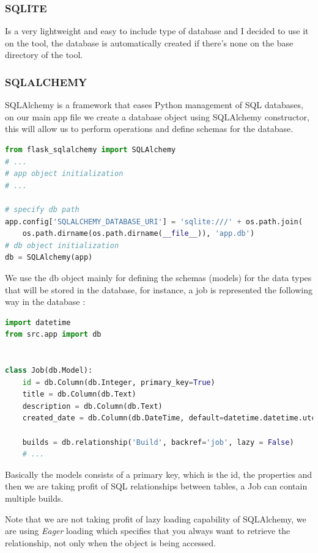 \documentclass{article}
\begin{document}
\subsubsection{SQLITE}

Is a very lightweight and easy to include type of database and I decided to use it on the tool, the database is automatically created if there's none on the base directory of the tool.

\subsubsection{SQLALCHEMY}

SQLAlchemy is a framework that eases Python management of \gls{SQL} databases, on our main app file we create a database object using SQLAlchemy constructor, this will allow us to perform operations and define schemas for the database.

\begin{lstlisting}[language=Python]
from flask_sqlalchemy import SQLAlchemy
# ...
# app object initialization
# ...

# specify db path
app.config['SQLALCHEMY_DATABASE_URI'] = 'sqlite:///' + os.path.join(
    os.path.dirname(os.path.dirname(__file__)), 'app.db') 
# db object initialization
db = SQLAlchemy(app) 
\end{lstlisting}

We use the db object mainly for defining the schemas (models) for the data types that will be stored in the database, for instance, a job is represented the following way in the database :

\begin{lstlisting}[language=Python]
import datetime
from src.app import db


class Job(db.Model):
    id = db.Column(db.Integer, primary_key=True)
    title = db.Column(db.Text)
    description = db.Column(db.Text)
    created_date = db.Column(db.DateTime, default=datetime.datetime.utcnow)

    builds = db.relationship('Build', backref='job', lazy = False)
    # ...
\end{lstlisting}

Basically the models consists of a primary key, which is the id, the properties and then we are taking profit of SQL relationships between tables, a Job can contain multiple builds.

Note that we are not taking profit of lazy loading capability of SQLAlchemy, we are using \textit{Eager} loading which specifies that you always want to retrieve the relationship, not only when the object is being accessed.
\end{document}
